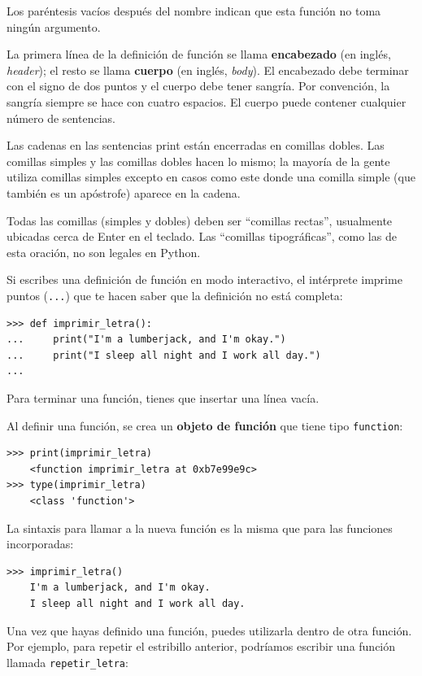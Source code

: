 \documentclass[10pt]{book}
\begin{document}
Los paréntesis vacíos después del nombre indican que esta función
no toma ningún argumento.

La primera línea de la definición de función se llama {\bf encabezado} (en inglés, {\em header});
el resto se llama {\bf cuerpo} (en inglés, {\em body}).  El encabezado debe terminar con el signo de dos puntos
y el cuerpo debe tener sangría.  Por convención, la sangría
siempre se hace con cuatro espacios.  El cuerpo puede contener
cualquier número de sentencias.

Las cadenas en las sentencias print están encerradas en comillas
dobles.  Las comillas simples y las comillas dobles hacen lo mismo;
la mayoría de la gente utiliza comillas simples excepto en casos como este donde
una comilla simple (que también es un apóstrofe) aparece en la cadena.

Todas las comillas (simples y dobles)
deben ser ``comillas rectas'', usualmente
ubicadas cerca de Enter en el teclado.  Las ``comillas tipográficas'', como
las de esta oración, no son legales en Python.

Si escribes una definición de función en modo interactivo, el intérprete
imprime puntos ({\tt ...}) que te hacen saber que la definición
no está completa:

\begin{verbatim}
>>> def imprimir_letra():
...     print("I'm a lumberjack, and I'm okay.")
...     print("I sleep all night and I work all day.")
...
\end{verbatim}
%
Para terminar una función, tienes que insertar una línea vacía.

Al definir una función, se crea un {\bf objeto de función} que tiene
tipo \verb"function":

\begin{verbatim}
>>> print(imprimir_letra)
    <function imprimir_letra at 0xb7e99e9c>
>>> type(imprimir_letra)
    <class 'function'>
\end{verbatim}
%
La sintaxis para llamar a la nueva función es la misma que
para las funciones incorporadas:

\begin{verbatim}
>>> imprimir_letra()
    I'm a lumberjack, and I'm okay.
    I sleep all night and I work all day.
\end{verbatim}
%
Una vez que hayas definido una función, puedes utilizarla dentro de otra
función.  Por ejemplo, para repetir el estribillo anterior, podríamos escribir
una función llamada \verb"repetir_letra":
\end{document}
